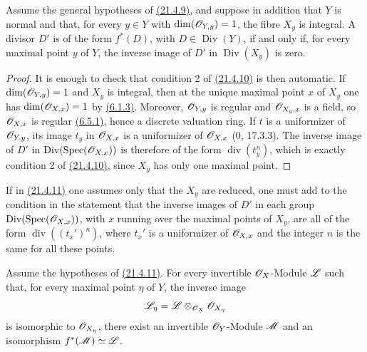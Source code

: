 \begin{corollary}[21.4.11]
\ifdefined\EGAIVSuppressErratumLabels\else\label{IV.21.4.11}\fi
Assume the general hypotheses of {\hyperref[IV.21.4.9]{(21.4.9)}}, and suppose in addition that
$Y$ is normal and that, for every $y\in Y$ with
$\dim(\mathscr{O}_{Y,y})=1$, the fibre $X_y$ is integral.  A divisor $D'$ is
of the form $f^*(D)$, with $D\in\operatorname{Div}(Y)$, if and only if,
for every maximal point $y$ of $Y$, the inverse image of $D'$ in
$\operatorname{Div}(X_y)$ is zero.
\end{corollary}

\begin{proof}
It is enough to check that condition 2\textdegree{} of {\hyperref[IV.21.4.10]{(21.4.10)}} is then
automatic.  If $\dim(\mathscr{O}_{Y,y})=1$ and $X_y$ is integral, then at
the unique maximal point $x$ of $X_y$ one has
$\dim(\mathscr{O}_{X,x})=1$ by {\hyperref[IV.6.1.3]{(6.1.3)}}.  Moreover,
$\mathscr{O}_{Y,y}$ is regular and $\mathscr{O}_{X_y,x}$ is a field, so
$\mathscr{O}_{X,x}$ is regular {\hyperref[IV.6.5.1]{(6.5.1)}}, hence a discrete valuation ring.
If $t$ is a uniformizer of $\mathscr{O}_{Y,y}$, its image $t_y$ in
$\mathscr{O}_{X,x}$ is a uniformizer of $\mathscr{O}_{X,x}$
($0$, 17.3.3).  The inverse image of $D'$ in
$\operatorname{Div}(\operatorname{Spec}(\mathscr{O}_{X,x}))$ is therefore
of the form $\operatorname{div}(t_y^n)$, which is exactly condition
2\textdegree{} of {\hyperref[IV.21.4.10]{(21.4.10)}}, since $X_y$ has only one maximal point.
\end{proof}

\begin{remark}[21.4.12]
\ifdefined\EGAIVSuppressErratumLabels\else\label{IV.21.4.12}\fi
If in {\hyperref[IV.21.4.11]{(21.4.11)}} one assumes only that the $X_y$ are reduced, one must
add to the condition in the statement that the inverse images of $D'$
in each group
$\operatorname{Div}(\operatorname{Spec}(\mathscr{O}_{X,x}))$, with $x$
running over the maximal points of $X_y$, are all of the form
$\operatorname{div}((t_x')^n)$, where $t_x'$ is a uniformizer of
$\mathscr{O}_{X,x}$ and the integer $n$ is the same for all these points.
\end{remark}

\begin{corollary}[21.4.13]
\ifdefined\EGAIVSuppressErratumLabels\else\label{IV.21.4.13}\fi
Assume the hypotheses of {\hyperref[IV.21.4.11]{(21.4.11)}}.  For every invertible
$\mathscr{O}_X$-Module $\mathscr{L}$ such that, for every maximal point $\eta$ of
$Y$, the inverse image
\[
 \mathscr{L}_\eta
 =\mathscr{L}\otimes_{\mathscr{O}_X}\mathscr{O}_{X_\eta}
\]
is isomorphic to $\mathscr{O}_{X_\eta}$, there exist an invertible
$\mathscr{O}_Y$-Module $\mathscr{M}$ and an isomorphism
$f^*(\mathscr{M})\simeq\mathscr{L}$.
\end{corollary}

